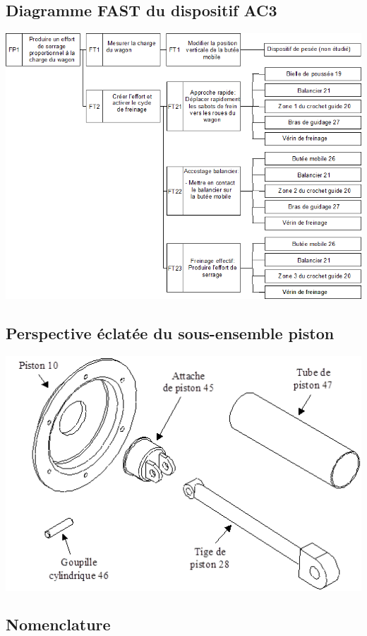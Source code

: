 \documentclass[11pt,oneside]{article}
\begin{document}
\subsection{Diagramme FAST du dispositif AC3}
\begin{center}
\includegraphics[width=.95\textwidth]{png/img9}
\end{center}


\subsection{Perspective éclatée du sous-ensemble piston}
\begin{center}
\includegraphics[width=.95\textwidth]{png/img10}
\end{center}

\subsection{Nomenclature}
\end{document}
